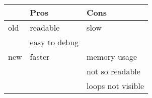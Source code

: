 \newpage



\begin{tabular}{lll}
\hline
 & Pros & Cons \\
\hline
\hline
old & readable &  slow\\
    & easy to debug         &       \\
new & faster & memory usage \\
    &        & not so readable \\
    &        & loops not visible \\
\hline
\end{tabular}


